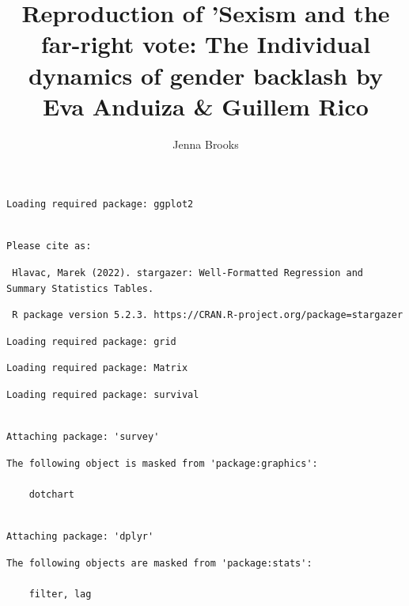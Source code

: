 \documentclass[
  letterpaper,
  DIV=11,
  numbers=noendperiod]{scrartcl}
\title{Reproduction of 'Sexism and the far-right vote: The Individual
dynamics of gender backlash by Eva Anduiza \& Guillem Rico}
\author{Jenna Brooks}
\date{}
\begin{document}
\maketitle


\begin{verbatim}
Loading required package: ggplot2
\end{verbatim}

\begin{verbatim}

Please cite as: 
\end{verbatim}

\begin{verbatim}
 Hlavac, Marek (2022). stargazer: Well-Formatted Regression and Summary Statistics Tables.
\end{verbatim}

\begin{verbatim}
 R package version 5.2.3. https://CRAN.R-project.org/package=stargazer 
\end{verbatim}

\begin{verbatim}
Loading required package: grid
\end{verbatim}

\begin{verbatim}
Loading required package: Matrix
\end{verbatim}

\begin{verbatim}
Loading required package: survival
\end{verbatim}

\begin{verbatim}

Attaching package: 'survey'
\end{verbatim}

\begin{verbatim}
The following object is masked from 'package:graphics':

    dotchart
\end{verbatim}

\begin{verbatim}

Attaching package: 'dplyr'
\end{verbatim}

\begin{verbatim}
The following objects are masked from 'package:stats':

    filter, lag
\end{verbatim}
\end{document}
